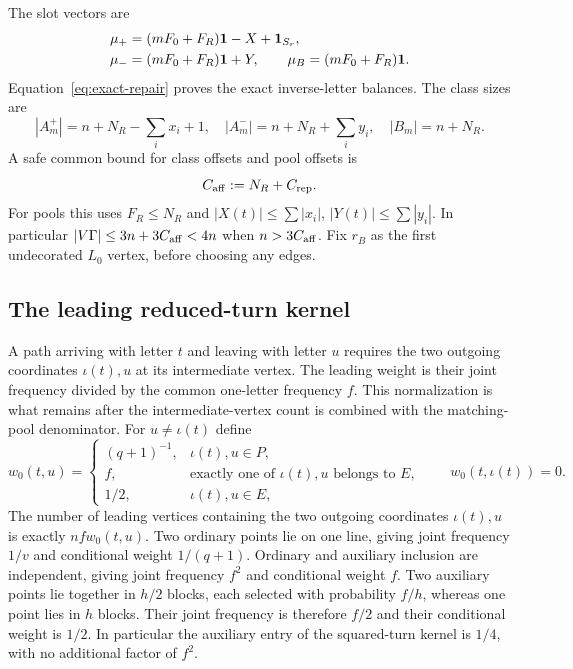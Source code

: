 The slot vectors are
\begin{align}
 \mu_+&=(mF_0+F_R)\mathbf1-X+\mathbf1_{S_r},\nonumber\\
 \mu_-&=(mF_0+F_R)\mathbf1+Y,\qquad
 \mu_B=(mF_0+F_R)\mathbf1.\label{eq:pool-vectors}
\end{align}
Equation~\eqref{eq:exact-repair} proves the exact inverse-letter balances. The class sizes are
\begin{equation}\label{eq:class-sizes}
 |A_m^+|=n+N_R-\sum_i x_i+1,\quad
 |A_m^-|=n+N_R+\sum_i y_i,\quad |B_m|=n+N_R.
\end{equation}
A safe common bound for class offsets and pool offsets is
\begin{equation}\label{eq:caff}
 C_{\rm aff}:=N_R+C_{\rm rep}.
\end{equation}
For pools this uses $F_R\le N_R$ and $|X(t)|\le\sum|x_i|$, $|Y(t)|\le\sum|y_i|$. In particular $|V\Gamma|\le3n+3C_{\rm aff}<4n$ when $n>3C_{\rm aff}$. Fix $r_B$ as the first undecorated $L_0$ vertex, before choosing any edges.

\subsection{The leading reduced-turn kernel}

A path arriving with letter $t$ and leaving with letter $u$ requires the two outgoing coordinates $\iota(t),u$ at its intermediate vertex. The leading weight is their joint frequency divided by the common one-letter frequency $f$. This normalization is what remains after the intermediate-vertex count is combined with the matching-pool denominator.
For $u\ne\iota(t)$ define
\begin{equation}\label{eq:wzero}
 w_0(t,u)=\begin{cases}
 (q+1)^{-1},&\iota(t),u\in P,\\
 f,&\text{exactly one of }\iota(t),u\text{ belongs to }E,\\
 1/2,&\iota(t),u\in E,
 \end{cases}
 \qquad w_0(t,\iota(t))=0.
\end{equation}
The number of leading vertices containing the two outgoing coordinates $\iota(t),u$ is exactly $nfw_0(t,u)$. Two ordinary points lie on one line, giving joint frequency $1/v$ and conditional weight $1/(q+1)$. Ordinary and auxiliary inclusion are independent, giving joint frequency $f^2$ and conditional weight $f$. Two auxiliary points lie together in $h/2$ blocks, each selected with probability $f/h$, whereas one point lies in $h$ blocks. Their joint frequency is therefore $f/2$ and their conditional weight is $1/2$. In particular the auxiliary entry of the squared-turn kernel is $1/4$, with no additional factor of $f^2$.

